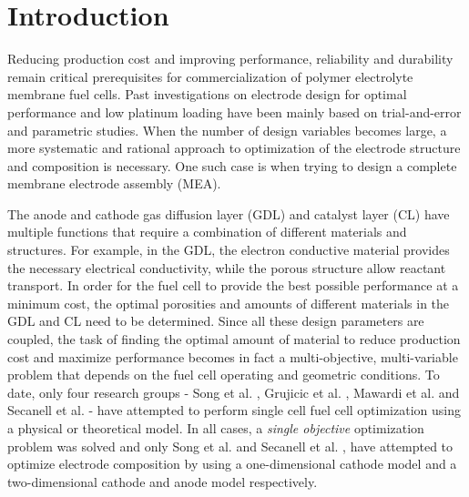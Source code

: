 \documentclass[]{elsart}
\begin{document}
\section{Introduction}  

Reducing production cost and improving performance, reliability and durability remain critical prerequisites for commercialization of polymer electrolyte membrane fuel cells. Past investigations on electrode design for optimal performance \cite{Sasikumar04,Passalacqua01,Antolini99,Xie05,Gode03} and low platinum loading \cite{Cunningham03,Mukerjee93,Madhu06} have been mainly based on trial-and-error and parametric studies. When the number of design variables becomes large, a more systematic and rational approach to optimization of the electrode structure and composition is necessary. One such case is when trying to design a complete membrane electrode assembly (MEA). 
 
 The anode and cathode gas diffusion layer (GDL) and catalyst layer (CL) have multiple functions that require a combination of different materials and structures. For example, in the GDL, the electron conductive material provides the necessary electrical conductivity, while the porous structure allow reactant transport. In order for the fuel cell to provide the best possible performance at a minimum cost, the optimal porosities and amounts of different materials in the GDL and CL need to be determined. Since all these design parameters are coupled, the task of finding the optimal amount of material to reduce production cost and maximize performance becomes in fact a multi-objective, multi-variable problem that depends on the fuel cell operating and geometric conditions. To date, only four research groups - Song et al. \cite{Song04,Song05}, Grujicic et al. \cite{Grujicic04,Grujicic04_2,Grujicic04_3}, Mawardi et al. \cite{Mawardi05} and Secanell et al. \cite{Secanell06,Secanell07a,Secanell07b,Secanell07c} - have attempted to perform single cell fuel cell optimization using a physical or theoretical model. In all cases, a {\em single objective} optimization problem was solved and only Song et al. \cite{Song04,Song05} and Secanell et al. \cite{Secanell06,Secanell07a,Secanell07b,Secanell07c}, have attempted to optimize electrode composition by using a one-dimensional cathode model and a two-dimensional cathode and anode model respectively.
\end{document}
